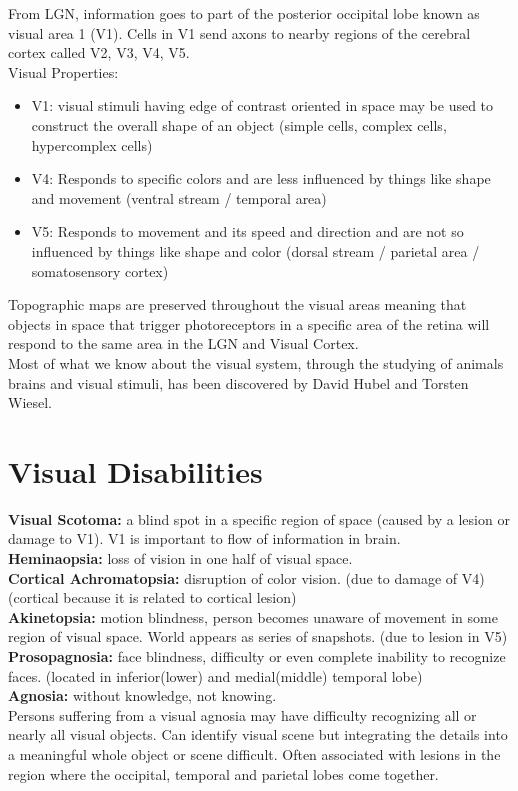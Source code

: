 \documentclass{article}
\begin{document}
From LGN, information goes to part of the posterior occipital lobe known as visual area 1 (V1). Cells in V1 send axons to nearby regions of the cerebral cortex called V2, V3, V4, V5. \\
Visual Properties: 
\begin{itemize}
    \item V1: visual stimuli having edge of contrast oriented in space may be used to construct the overall shape of an object (simple cells, complex cells, hypercomplex cells) 
    \item V4: Responds to specific colors and are less influenced by things like shape and movement (ventral stream / temporal area) 
    \item V5: Responds to movement and its speed and direction and are not so influenced by things like shape and color (dorsal stream / parietal area / somatosensory cortex) 
\end{itemize}

Topographic maps are preserved throughout the visual areas meaning that objects in space that trigger photoreceptors in a specific area of the retina will respond to the same area in the LGN and Visual Cortex. \\

Most of what we know about the visual system, through the studying of animals brains and visual stimuli, has been discovered by David Hubel and Torsten Wiesel. \\

\newpage
\section{Visual Disabilities}

\noindent \textbf{Visual Scotoma:} a blind spot in a specific region of space (caused by a lesion or damage to V1). V1 is important to flow of information in brain. \\

\noindent \textbf{Heminaopsia:} loss of vision in one half of visual space. \\

\noindent \textbf{Cortical Achromatopsia:} disruption of color vision. (due to damage of V4) (cortical because it is related to cortical lesion) \\

\noindent \textbf{Akinetopsia:} motion blindness, person becomes unaware of movement in some region of visual space. World appears as series of snapshots. (due to lesion in V5) \\

\noindent \textbf{Prosopagnosia:} face blindness, difficulty or even complete inability to recognize faces. (located in inferior(lower) and medial(middle) temporal lobe) \\

\noindent \textbf{Agnosia:} without knowledge, not knowing. \\

Persons suffering from a visual agnosia may have difficulty recognizing all or nearly all visual objects. Can identify visual scene but integrating the details into a meaningful whole object or scene difficult. Often associated with lesions in the region where the occipital, temporal and parietal lobes come together. 
\end{document}
